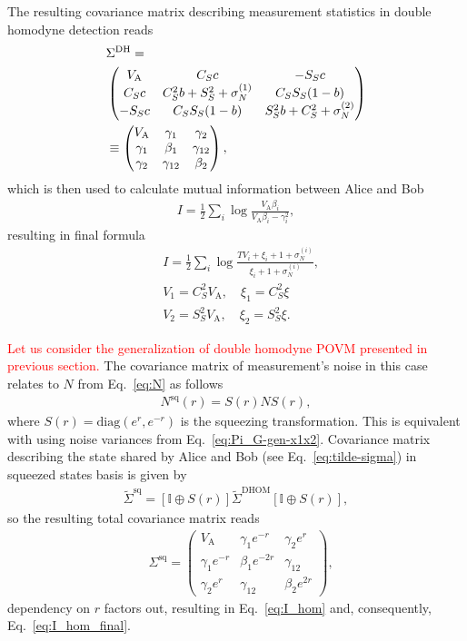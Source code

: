 \documentclass[%
reprint,
superscriptaddress,
 amsmath,amssymb,amsfonts,
 aps,
 pra,
 longbibliography
]{revtex4-2}
\newcommand{\ind}[1]{\mathrm{#1}}
\begin{document}
The resulting covariance matrix describing measurement statistics
in double homodyne detection reads
\begin{align}
  \label{eq:sigma_qp_dhom}
    &\Sigma^{\ind{DH}}=\notag\\
    &\begin{pmatrix}
        V_{\ind{A}}&C_Sc&-S_Sc\\
        C_Sc&C_S^2b+S_S^2+\sigma_N^{(1)}&C_SS_S(1-b)\\
        -S_Sc&C_SS_S(1-b)&S_S^2b+C_S^2+\sigma_N^{(2)}
    \end{pmatrix}\notag\\
    &\equiv 
    \begin{pmatrix}
        V_{\ind{A}}&\gamma_1&\gamma_2\\
        \gamma_1&\beta_1&\gamma_{12}\\
        \gamma_2&\gamma_{12}&\beta_2
    \end{pmatrix}
    ,
\end{align}
which is then used to calculate mutual information between Alice and Bob
\begin{align}
  \label{eq:I_hom}
    I=\frac{1}{2}\sum_i
    \log\frac{V_{\ind{A}} \beta_i}{V_{\ind{A}}\beta_i-\gamma_i^2},
\end{align}
resulting in final formula
\begin{align}
  \label{eq:I_hom_final}
    &I=\frac{1}{2}\sum_i\log \frac{TV_i+\xi_i+1+\sigma_N^{(i)}}{\xi_i+1+\sigma_N^{(i)}}, \\
    &V_1=C_S^2V_{\ind{A}},\quad \xi_1=C_S^2\xi\\
    &V_2=S_S^2V_{\ind{A}},\quad \xi_2=S_S^2\xi.
\end{align}

\textcolor{red}{Let us consider the generalization of double homodyne POVM presented in previous section.} The covariance matrix of measurement's noise in this case relates to $N$ from Eq.~\eqref{eq:N} as follows
\begin{align}
  \label{eq:N_sq}
  N^{\ind{sq}}(r)=S(r) N S(r),
\end{align}
where $S(r)=\ind{diag}(e^r, e^{-r})$ is the squeezing transformation. This is equivalent with using noise variances from Eq.~\eqref{eq:Pi_G-gen-x1x2}. Covariance matrix describing the state shared by Alice and Bob (see Eq.~\eqref{eq:tilde-sigma}) in squeezed states basis is given by
\begin{align}
  \label{eq:tildesigmasq}
  \tilde\Sigma^{\ind{sq}}=\left[\mathbb{I}\oplus S(r)\right]\tilde\Sigma^{\ind{DHOM}}\left[\mathbb{I}\oplus S(r)\right],
\end{align}
so the resulting total covariance matrix reads
\begin{align}
  \label{eq:Sigma_sq}
  &\Sigma^{\ind{sq}}=\begin{pmatrix}
        V_{\ind{A}}&\gamma_1e^{-r}&\gamma_2e^{r}\\
        \gamma_1e^{-r}&\beta_1e^{-2r}&\gamma_{12}\\
        \gamma_2e^{r}&\gamma_{12}&\beta_2e^{2r}
    \end{pmatrix},
\end{align}
dependency on $r$ factors out, resulting in Eq.~\eqref{eq:I_hom} and, consequently, Eq.~\eqref{eq:I_hom_final}. 
\end{document}
